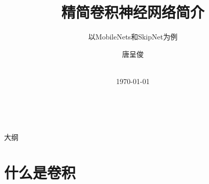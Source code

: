 

\newcommand{\balA}[1][1]{BAL$^\mathup{I}_{#1:#1}$\xspace}
\newcommand{\unbalA}[1][n]{UNBAL$^\mathup{I}_{1:#1}$\xspace}
\newcommand{\balB}[1][1]{BAL$^\mathup{II}_{#1:#1}$\xspace}
\newcommand{\unbalB}[1][n]{UNBAL$^\mathup{II}_{#1:1}$\xspace}



\title{精简卷积神经网络简介}

\subtitle{以MobileNets和SkipNet为例}

\author[唐呈俊]{%
	唐呈俊
} %


\date{%
	\\[\medskipamount]
	\textmd{\today}%
}






\begin{frame}[standout]{~}

	\titlepage%

\end{frame}


\begin{frame}[standout]{大纲}

	\medskip
	\tableofcontents

\end{frame}






\section{什么是卷积}


